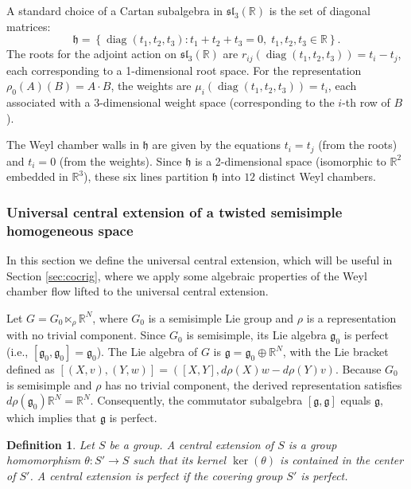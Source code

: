 \documentclass[11pt]{amsart}
\numberwithin{equation}{section}
\theoremstyle{plain}
\newtheorem{defi}{Definition}[section]
\begin{document}
A standard choice of a Cartan subalgebra in $\mathfrak{sl}_3(\mathbb{R})$ is the set of diagonal matrices:
\[
\mathfrak{h} = \left\{ \operatorname{diag}(t_1, t_2, t_3) : t_1 + t_2 + t_3 = 0, \; t_1, t_2, t_3 \in \mathbb{R} \right\}.
\]
The roots for the adjoint action on $\mathfrak{sl}_3(\mathbb{R})$ are $r_{ij}(\operatorname{diag}(t_1,t_2,t_3)) = t_i - t_j$, each corresponding to a 1-dimensional root space.
For the representation $\rho_0(A)(B) = A \cdot B$, the weights are $\mu_i(\operatorname{diag}(t_1,t_2,t_3)) = t_i$, each associated with a 3-dimensional weight space (corresponding to the $i$-th row of $B$).

The Weyl chamber walls in $\mathfrak{h}$ are given by the equations $t_i = t_j$ (from the roots) and $t_i = 0$ (from the weights). Since $\mathfrak{h}$ is a 2-dimensional space (isomorphic to $\mathbb{R}^2$ embedded in $\mathbb{R}^3$), these six lines partition $\mathfrak{h}$ into $12$ distinct Weyl chambers.


\subsubsection{Universal central extension of a twisted semisimple homogeneous space}\label{cenext}
In this section we define the universal central extension, which will be useful in Section \ref{sec:cocrig}, where we apply some algebraic properties of the Weyl chamber flow lifted to the universal central extension. 

Let $G = G_0 \ltimes_\rho \mathbb{R}^N$, where $G_0$ is a semisimple Lie group and $\rho$ is a representation with no trivial component. Since $G_0$ is semisimple, its Lie algebra $\mathfrak{g}_0$ is perfect (i.e., $[\mathfrak{g}_0, \mathfrak{g}_0] = \mathfrak{g}_0$). The Lie algebra of $G$ is $\mathfrak{g} = \mathfrak{g}_0 \oplus \mathbb{R}^N$, with the Lie bracket defined as $[(X,v), (Y,w)] = ([X,Y], d\rho(X)w - d\rho(Y)v)$. Because $G_0$ is semisimple and $\rho$ has no trivial component, the derived representation satisfies $d\rho(\mathfrak{g}_0)\mathbb{R}^N=\mathbb{R}^N$. Consequently, the commutator subalgebra $[\mathfrak{g},\mathfrak{g}]$ equals $\mathfrak{g}$, which implies that $\mathfrak{g}$ is perfect.

\begin{defi}
    Let $S$ be a group. A \emph{central extension} of $S$ is a group homomorphism $\theta: S' \to S$ such that its kernel $\ker(\theta)$ is contained in the center of $S'$. A central extension is \emph{perfect} if the covering group $S'$ is perfect.
\end{defi}
\end{document}
